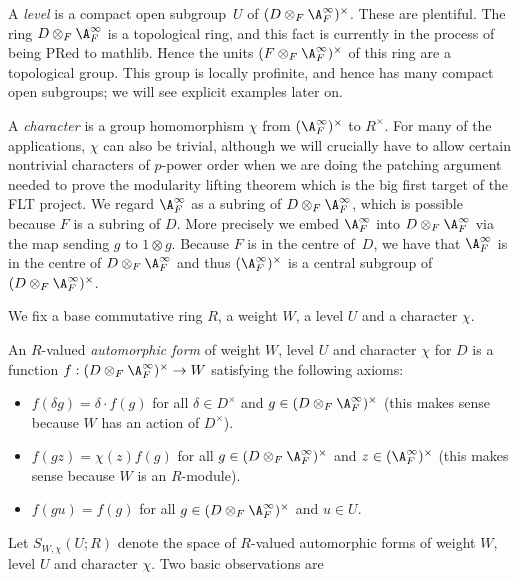 A \emph{level} is a compact open subgroup~$U$ of $(D\otimes_F\A_F^\infty)^\times$. These are plentiful.
The ring $D\otimes_F\A_F^\infty$ is a topological ring, and this fact is currently in the process
of being PRed to mathlib. Hence the units $(F\otimes_F\A_F^\infty)^\times$ of this ring are a topological
group. This group is locally profinite, and hence has many compact open subgroups; we will see
explicit examples later on.

A \emph{character} is a group homomorphism $\chi$ from $(\A_F^\infty)^\times$ to $R^\times$. For many
of the applications, $\chi$ can also be trivial, although we will crucially have to allow
certain nontrivial characters of $p$-power order when we are doing the patching argument needed
to prove the modularity lifting theorem which is the big first target of the FLT project.
We regard $\A_F^\infty$ as a subring of $D\otimes_F\A_F^\infty$, which is possible because
$F$ is a subring of $D$. More precisely we embed $\A_F^\infty$ into $D\otimes_F\A_F^\infty$
via the map sending $g$ to $1\otimes g$. Because $F$ is in the centre of~$D$, we have
that $\A_F^\infty$ is in the centre of $D\otimes_F\A_F^\infty$ and thus $(\A_F^\infty)^\times$
is a central subgroup of $(D\otimes_F\A_F^\infty)^\times$.

We fix a base commutative ring $R$, a weight $W$, a level $U$ and a character $\chi$.

\begin{definition}
  \label{TotallyDefiniteQuaternionAlgebra.AutomorphicForm}
  \leanok
  An $R$-valued \emph{automorphic form} of weight $W$, level $U$ and character $\chi$ for $D$ is
  a function $f:(D\otimes_F\A_F^\infty)^\times\to W$ satisfying the following axioms:
  \begin{itemize}
    \item $f(\delta g)=\delta\cdot f(g)$ for all $\delta\in D^\times$ and $g\in (D\otimes_F\A_F^\infty)^\times$
    (this makes sense because $W$ has an action of $D^\times$).
    \item $f(gz)=\chi(z)f(g)$ for all $g\in (D\otimes_F\A_F^\infty)^\times$ and $z\in(\A_F^\infty)^\times$
    (this makes sense because $W$ is an $R$-module).
    \item $f(gu)=f(g)$ for all $g\in (D\otimes_F\A_F^\infty)^\times$ and $u\in U$.
  \end{itemize}
\end{definition}

Let $S_{W,\chi}(U;R)$ denote the space of $R$-valued automorphic forms of weight $W$, level $U$ and character
$\chi$. Two basic observations are

